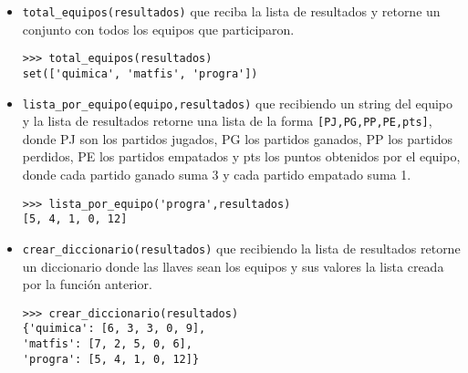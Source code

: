\begin{itemize}
    \item \texttt{total\_equipos(resultados)} que reciba la lista de resultados y retorne un conjunto con todos los equipos que participaron.
    
    \begin{lstlisting}[style=consola]
>>> total_equipos(resultados)
set(['quimica', 'matfis', 'progra'])
    \end{lstlisting}
    
    \item \texttt{lista\_por\_equipo(equipo,resultados)} que recibiendo un string del equipo y la lista de resultados retorne una lista de la forma \texttt{[PJ,PG,PP,PE,pts]}, donde PJ son los partidos jugados, PG los partidos ganados, PP los partidos perdidos, PE los partidos empatados y pts los puntos obtenidos por el equipo, donde cada partido ganado suma 3 y cada partido empatado suma 1.
    
\begin{lstlisting}[style=consola]
>>> lista_por_equipo('progra',resultados)
[5, 4, 1, 0, 12]
\end{lstlisting}
    \item \texttt{crear\_diccionario(resultados)} que recibiendo la lista de resultados retorne un diccionario donde las llaves sean los equipos y sus valores la lista creada por la función anterior.
    
    \begin{lstlisting}[style=consola]
>>> crear_diccionario(resultados)
{'quimica': [6, 3, 3, 0, 9], 
'matfis': [7, 2, 5, 0, 6], 
'progra': [5, 4, 1, 0, 12]}    
    \end{lstlisting}
\end{itemize}